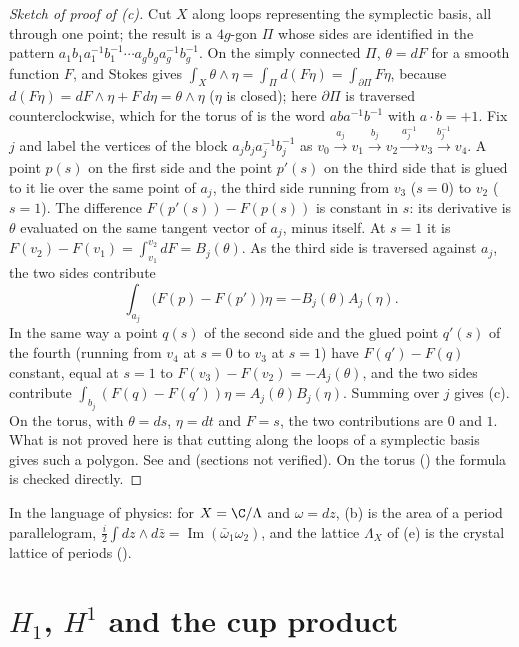 \begin{proof}[Sketch of proof of (c)]
Cut $X$ along loops representing the symplectic basis, all through one point; the result is a $4g$-gon $\Pi$ whose sides are identified in the pattern
$a_1b_1a_1^{-1}b_1^{-1}\cdots a_gb_ga_g^{-1}b_g^{-1}$. On the simply connected $\Pi$, $\theta=dF$ for a smooth function $F$, and Stokes gives
$\int_X\theta\wedge\eta=\int_\Pi d(F\eta)=\int_{\partial\Pi}F\eta$, because $d(F\eta)=dF\wedge\eta+F\,d\eta=\theta\wedge\eta$ ($\eta$ is closed); here $\partial\Pi$ is traversed
counterclockwise, which for the torus of  is the word $aba^{-1}b^{-1}$ with $a\cdot b=+1$. Fix $j$ and label the vertices of the block
$a_jb_ja_j^{-1}b_j^{-1}$ as $v_0\xrightarrow{a_j}v_1\xrightarrow{b_j}v_2\xrightarrow{a_j^{-1}}v_3\xrightarrow{b_j^{-1}}v_4$. A point $p(s)$ on the first side and the point $p'(s)$ on the
third side that is glued to it lie over the same point of $a_j$, the third side running from $v_3$ ($s=0$) to $v_2$ ($s=1$). The difference $F(p'(s))-F(p(s))$ is
constant in $s$: its derivative is $\theta$ evaluated on the same tangent vector of $a_j$, minus itself. At $s=1$ it is $F(v_2)-F(v_1)=\int_{v_1}^{v_2}dF=B_j(\theta)$. As
the third side is traversed against $a_j$, the two sides contribute
\[
\int_{a_j}\bigl(F(p)-F(p')\bigr)\eta=-B_j(\theta)A_j(\eta).
\]
In the same way a point $q(s)$ of the second side and the glued point $q'(s)$ of the fourth (running from $v_4$ at $s=0$ to $v_3$ at $s=1$) have
$F(q')-F(q)$ constant, equal at $s=1$ to $F(v_3)-F(v_2)=-A_j(\theta)$, and the two sides contribute $\int_{b_j}(F(q)-F(q'))\eta=A_j(\theta)B_j(\eta)$. Summing over
$j$ gives (c). On the torus, with $\theta=ds$, $\eta=dt$ and $F=s$, the two contributions are $0$ and $1$. What is not proved here is that cutting along the
loops of a symplectic basis gives such a polygon. See \cite[Chapter VIII]{Miranda}
and \cite[Chapter 2, Section 2]{GriffithsHarris78} (sections not verified). On the torus () the formula is checked directly.
\end{proof}

In the language of physics: for $X=\C/\Lambda$ and $\omega=dz$, (b) is the area of a period parallelogram, $\frac i2\int dz\wedge d\bar z=\operatorname{Im}(\bar\omega_1\omega_2)$, and
the lattice $\Lambda_X$ of (e) is the crystal lattice of periods ().

\section{\texorpdfstring{$H_1$, $H^1$}{H1, H1} and the cup product}\label{sec:curves:cohomology}

